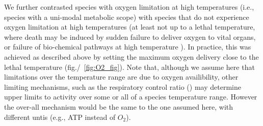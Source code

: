 \documentclass[11pt]{article}\usepackage[]{graphicx}\usepackage[]{color}
\begin{document}
We further contrasted species with oxygen limitation at high temperatures (i.e., species with a uni-modal metabolic scope) with species that do not experience oxygen limitation at high temperatures (at least not up to a lethal temperature, where death may be induced by sudden failure to deliver oxygen to vital organs, or failure of bio-chemical pathways at high temperature \cite{salin_inadequate_2016,iftikar_mitochondria_2013}). In practice, this was achieved as described above by setting the maximum oxygen delivery close to the lethal temperature (fig./~\ref{fig:O2_fig}). Note that, although we assume here that limitations over the temperature range are due to oxygen availibility, other limiting mechanisms, such as the respiratory control ratio (\cite{salin_inadequate_2016,iftikar_mitochondria_2013}) may determine upper limits to activity over some or all of a species temperature range. However the over-all mechanism would be the same to the one assumed here, with different untis (e.g., ATP instead of $O_2$).
\end{document}
